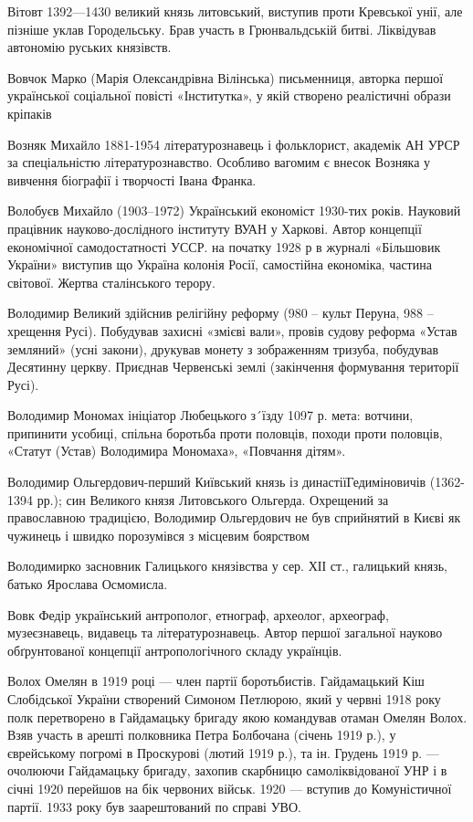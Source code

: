 Вітовт 1392—1430 великий князь литовський, виступив проти Кревської унії, але пізніше уклав Городельську. Брав участь в Грюнвальдській битві. Ліквідував автономію руських князівств.

Вовчок Марко (Марія Олександрівна Вілінська) письменниця, авторка першої української соціальної повісті «Інститутка», у якій створено реалістичні образи кріпаків

Возняк Михайло 1881-1954 літературознавець і фольклорист, академік АН УРСР за спеціальністю літературознавство. Особливо вагомим є внесок Возняка у вивчення біографії і творчості Івана Франка.   

Волобуєв Михайло (1903–1972) Український економіст 1930-тих років. Науковий працівник науково-дослідного інституту ВУАН у Харкові. Автор концепції економічної самодостатності УССР. на початку 1928 р в журналі «Більшовик України» виступив що Україна колонія Росії, самостійна економіка, частина світової. Жертва сталінського терору.

Володимир Великий здійснив релігійну реформу (980 – культ Перуна, 988 – хрещення Русі). Побудував захисні «змієві вали», провів судову реформа «Устав земляний» (усні закони), друкував монету з зображенням тризуба, побудував Десятинну церкву. Приєднав Червенські землі (закінчення формування території Русі).

Володимир Мономах ініціатор Любецького з´їзду 1097 р. мета: вотчини, припинити усобиці, спільна боротьба проти половців, походи проти половців, «Статут (Устав) Володимира Мономаха», «Повчання дітям».

Володимир Ольгердович-перший Київський князь із династіїГедиміновичів (1362-1394 рр.); син Великого князя Литовського Ольгерда. Охрещений за православною традицією, Володимир Ольгердович не був сприйнятий в Києві як чужинець і швидко порозумівся з місцевим боярством

Володимирко засновник Галицького князівства у сер. ХІІ ст., галицький князь, батько Ярослава Осмомисла.

Вовк Федір український антрополог, етнограф, археолог, археограф, музеєзнавець, видавець та літературознавець. Автор першої загальної науково обґрунтованої концепції антропологічного складу українців.

Волох Омелян в 1919 році — член партії боротьбистів. Гайдамацький Кіш Слобідської України створений Симоном Петлюрою, який у червні 1918 року полк перетворено в Гайдамацьку бригаду якою командував отаман Омелян Волох. Взяв участь в арешті полковника Петра Болбочана (січень 1919 р.), у єврейському погромі в Проскурові (лютий 1919 р.), та ін. Грудень 1919 р. — очолюючи Гайдамацьку бригаду, захопив скарбницю самоліквідованої УНР і в січні 1920 перейшов на бік червоних військ. 1920 — вступив до Комуністичної партії. 1933 року був заарештований по справі УВО. 


